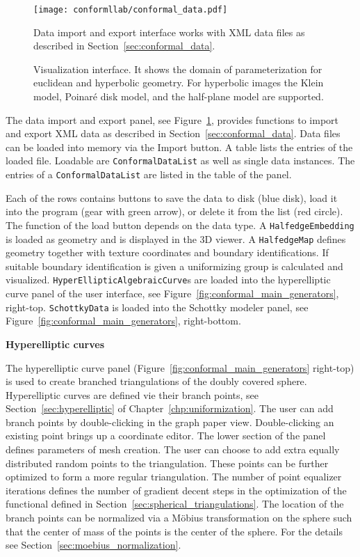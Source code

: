 \documentclass[Thesis.tex]{subfiles}
\begin{document}
\begin{figure}
\centering
\texttt{[image: conformllab/conformal\_data.pdf]}
\caption{Data import and export interface works with XML data files as described in 
Section~\ref{sec:conformal_data}.}
\label{fig:data_interface}
\end{figure}

\begin{figure}
\caption{Visualization interface. It shows the domain of parameterization for euclidean and hyperbolic geometry. 
For hyperbolic images the Klein model, Poinar\'e disk model, and the half-plane model are supported.}
\label{fig:visualization_interfaces}
\end{figure}

The data import and export panel, see Figure~\ref{fig:data_interface}, provides functions to import and export XML data as described in Section~\ref{sec:conformal_data}.  
Data files can be loaded into memory via the Import button. A table lists the entries of the loaded file.  
Loadable are {\tt ConformalDataList} as well as single data instances. 
The entries of a {\tt ConformalDataList} are listed in the table of the panel. 

Each of the rows contains buttons to save the data to disk (blue disk), load it into the program (gear with green arrow), or delete it from the list (red circle).  
The function of the load button depends on the data type. 
A {\tt HalfedgeEmbedding} is loaded as geometry and is displayed in the 3D viewer. 
A {\tt HalfedgeMap} defines geometry together with texture coordinates and boundary identifications. 
If suitable boundary identification is given a uniformizing group is calculated and visualized. 
{\tt HyperEllipticAlgebraicCurve}s are loaded into the hyperelliptic curve panel of the user interface, see Figure~\ref{fig:conformal_main_generators}, right-top.  
{\tt SchottkyData} is loaded into the Schottky modeler panel, see Figure~\ref{fig:conformal_main_generators}, right-bottom.


{\bf Hyperelliptic curves}

The hyperelliptic curve panel (Figure~\ref{fig:conformal_main_generators} right-top) is used to create branched triangulations of the doubly covered sphere.
Hyperelliptic curves are defined vie their branch points, see Section~\ref{sec:hyperelliptic} of Chapter~\ref{chp:uniformization}.
The user can add branch points by double-clicking in the graph paper view.
Double-clicking an existing point brings up a coordinate editor. 
The lower section of the panel defines parameters of mesh creation. 
The user can choose to add extra equally distributed random points to the triangulation.
These points can be further optimized to form a more regular triangulation.
The number of point equalizer iterations defines the number of gradient decent steps in the optimization of the functional defined in Section~\ref{sec:spherical_triangulations}.
The location of the branch points can be normalized via a M{\"o}bius transformation on the sphere such that the center of mass of the points is the center of the sphere. For the details see Section~\ref{sec:moebius_normalization}.
\end{document}
